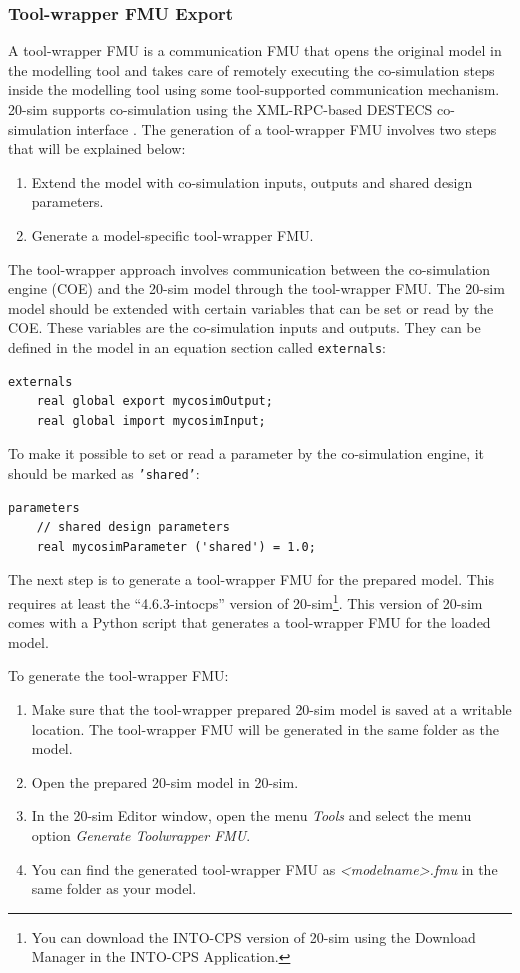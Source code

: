 \subsubsection{Tool-wrapper FMU Export}\label{sec:simulators:20sim:toolwrapperfmu}
A tool-wrapper FMU is a communication FMU that opens the original model in the modelling tool and takes care of remotely executing the co-simulation steps inside the modelling tool using some tool-supported communication mechanism.
%
{20-sim} supports co-simulation using the XML-RPC-based DESTECS co-simulation interface \cite{DESTECSD32b}.
%
The generation of a tool-wrapper FMU involves two steps that will be explained below:
\begin{enumerate}
  \item Extend the model with co-simulation inputs, outputs and shared design parameters.
  \item Generate a model-specific tool-wrapper FMU.
\end{enumerate}

The tool-wrapper approach involves communication between the co-si\-mu\-la\-tion engine (COE) and the {20-sim} model through the tool-wrapper FMU.
The {20-sim} model should be extended with certain variables that can be set or read by the COE.
These variables are the co-simulation inputs and outputs.
They can be defined in the model in an equation section called \texttt{externals}:  

\begin{lstlisting}
externals
	real global export mycosimOutput;
	real global import mycosimInput;
\end{lstlisting}

To make it possible to set or read a parameter by the co-simulation engine, it should be marked as \texttt{'shared'}:

\begin{lstlisting}
parameters
	// shared design parameters
	real mycosimParameter ('shared') = 1.0;
\end{lstlisting}

The next step is to generate a tool-wrapper FMU for the prepared model.
This requires at least the ``{4.6.3}-intocps'' version of {20-sim}\footnote{You can download the INTO-CPS version of 20-sim using the Download Manager in the INTO-CPS Application.}.
This version of {20-sim} comes with a Python script that generates a tool-wrapper FMU for the loaded model.

To generate the tool-wrapper FMU:
\begin{enumerate}
  \item Make sure that the tool-wrapper prepared {20-sim} model is saved at a writable location.
  The tool-wrapper FMU will be generated in the same folder as the model.
  \item Open the prepared {20-sim} model in {20-sim}.
  \item In the 20-sim Editor window, open the menu \textit{Tools} and select the menu option \textit{Generate Toolwrapper FMU}.
  \item You can find the generated tool-wrapper FMU as \textit{<modelname>.fmu} in the same folder as your model.

\end{enumerate}

